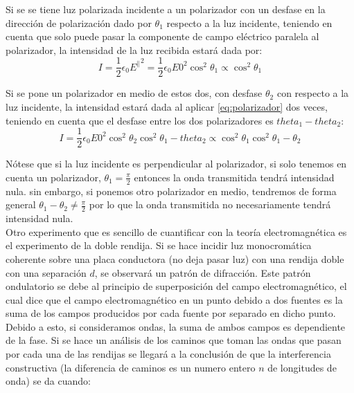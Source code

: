 \documentclass[%
 reprint,
 amsmath,amssymb,
 aps,
]{revtex4-1}
\begin{document}
Si se se tiene luz polarizada incidente a un polarizador con un desfase en la dirección de polarización dado por $\theta_1$ respecto a la luz incidente, teniendo en cuenta que solo puede pasar la componente de campo eléctrico paralela al polarizador, la intensidad de la luz recibida estará dada por:\\

\begin{equation}
I = \frac{1}{2}\epsilon_0{E^{\parallel}}^2 = \frac{1}{2}\epsilon_0{E0}^2{\cos^2{\theta_1}} \propto \cos^2{\theta_1}
\label{polarizador}
\end{equation}

Si se pone un polarizador en medio de estos dos, con desfase $\theta_2$ con respecto a la luz incidente, la intensidad estará dada al aplicar \ref{eq:polarizador} dos veces, teniendo en cuenta que el desfase entre los dos polarizadores es $theta_1-theta_2$:\\

\begin{equation}
I = \frac{1}{2}\epsilon_0{E0}^2{\cos^2{\theta_2}}\cos^2{\theta_1-theta_2} \propto \cos^2{\theta_1}\cos^2{\theta_1-\theta_2}
\label{polarizador2}
\end{equation}

Nótese que si la luz incidente es perpendicular al polarizador, si solo tenemos en cuenta un polarizador, $\theta_1 = \frac{\pi}{2}$ entonces la onda transmitida tendrá intensidad nula. sin embargo, si ponemos otro polarizador en medio, tendremos de forma general $\theta_1 - \theta_2 \neq \frac{\pi}{2}$ por lo que la onda transmitida no necesariamente tendrá intensidad nula.\\

Otro experimento que es sencillo de cuantificar con la teoría electromagnética es el experimento de la doble rendija. Si se hace incidir luz monocromática coherente sobre una placa conductora (no deja pasar luz) con una rendija doble con una separación $d$, se observará un patrón de difracción. Este patrón ondulatorio se debe al principio de superposición del campo electromagnético, el cual dice que el campo electromagnético en un punto debido a dos fuentes es la suma de los campos producidos por cada fuente por separado en dicho punto. Debido a esto, si consideramos ondas, la suma de ambos campos es dependiente de la fase. Si se hace un análisis de los caminos que toman las ondas que pasan por cada una de las rendijas se llegará a la conclusión de que la interferencia constructiva (la diferencia de caminos es un numero entero $n$ de longitudes de onda) se da cuando:\\
\end{document}
